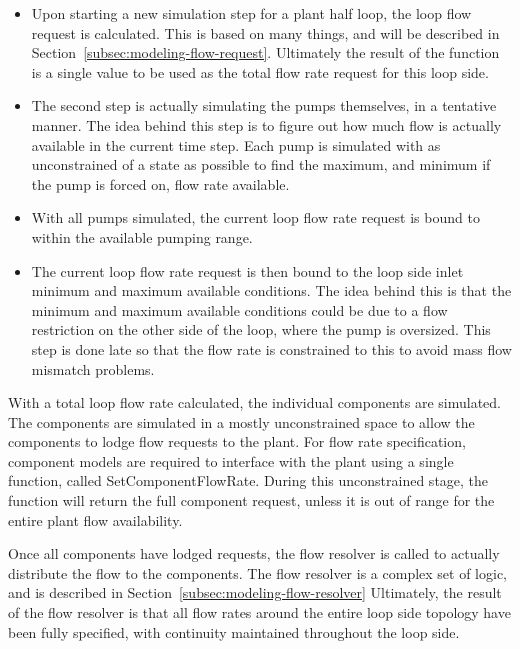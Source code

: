 \documentclass{report}
\begin{document}
            \begin{itemize}
                \item Upon starting a new simulation step for a plant half loop, the loop flow request is calculated.
                      This is based on many things, and will be described in Section~\ref{subsec:modeling-flow-request}.
                      Ultimately the result of the function is a single value to be used as the total flow rate request for this loop side.
                \item The second step is actually simulating the pumps themselves, in a tentative manner.
                      The idea behind this step is to figure out how much flow is actually available in the current time step.
                      Each pump is simulated with as unconstrained of a state as possible to find the maximum, and minimum if the pump is forced on, flow rate available.
                \item With all pumps simulated, the current loop flow rate request is bound to within the available pumping range.
                \item The current loop flow rate request is then bound to the loop side inlet minimum and maximum available conditions.
                      The idea behind this is that the minimum and maximum available conditions could be due to a flow restriction on the other side of the loop, where the pump is oversized.
                      This step is done late so that the flow rate is constrained to this to avoid mass flow mismatch problems.
            \end{itemize}

            With a total loop flow rate calculated, the individual components are simulated.
            The components are simulated in a mostly unconstrained space to allow the components to lodge flow requests to the plant.
            For flow rate specification, component models are required to interface with the plant using a single function, called SetComponentFlowRate.
            During this unconstrained stage, the function will return the full component request, unless it is out of range for the entire plant flow availability.

            Once all components have lodged requests, the flow resolver is called to actually distribute the flow to the components.
            The flow resolver is a complex set of logic, and is described in Section~\ref{subsec:modeling-flow-resolver}
            Ultimately, the result of the flow resolver is that all flow rates around the entire loop side topology have been fully specified, with continuity maintained throughout the loop side.
\end{document}
